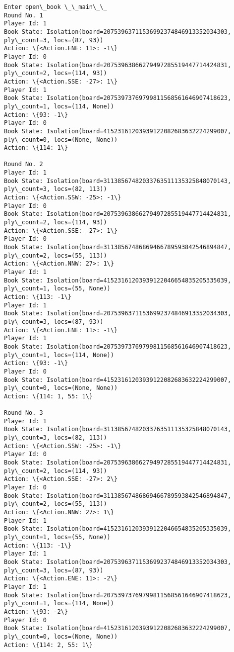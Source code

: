 \documentclass[11pt]{article}
\begin{document}
    \begin{Verbatim}[commandchars=\\\{\}]
Enter open\_book \_\_main\_\_
Round No. 1
Player Id: 1
Book State: Isolation(board=20753963711536992374846913352034303, ply\_count=3, locs=(87, 93))
Action: \{<Action.ENE: 11>: -1\}
Player Id: 0
Book State: Isolation(board=20753963866279497285519447714424831, ply\_count=2, locs=(114, 93))
Action: \{<Action.SSE: -27>: 1\}
Player Id: 1
Book State: Isolation(board=20753973769799811568561646907418623, ply\_count=1, locs=(114, None))
Action: \{93: -1\}
Player Id: 0
Book State: Isolation(board=41523161203939122082683632224299007, ply\_count=0, locs=(None, None))
Action: \{114: 1\}

Round No. 2
Player Id: 1
Book State: Isolation(board=31138567482033763511135325848070143, ply\_count=3, locs=(82, 113))
Action: \{<Action.SSW: -25>: -1\}
Player Id: 0
Book State: Isolation(board=20753963866279497285519447714424831, ply\_count=2, locs=(114, 93))
Action: \{<Action.SSE: -27>: 1\}
Player Id: 0
Book State: Isolation(board=31138567486869466789593842546894847, ply\_count=2, locs=(55, 113))
Action: \{<Action.NNW: 27>: 1\}
Player Id: 1
Book State: Isolation(board=41523161203939122046654835205335039, ply\_count=1, locs=(55, None))
Action: \{113: -1\}
Player Id: 1
Book State: Isolation(board=20753963711536992374846913352034303, ply\_count=3, locs=(87, 93))
Action: \{<Action.ENE: 11>: -1\}
Player Id: 1
Book State: Isolation(board=20753973769799811568561646907418623, ply\_count=1, locs=(114, None))
Action: \{93: -1\}
Player Id: 0
Book State: Isolation(board=41523161203939122082683632224299007, ply\_count=0, locs=(None, None))
Action: \{114: 1, 55: 1\}

Round No. 3
Player Id: 1
Book State: Isolation(board=31138567482033763511135325848070143, ply\_count=3, locs=(82, 113))
Action: \{<Action.SSW: -25>: -1\}
Player Id: 0
Book State: Isolation(board=20753963866279497285519447714424831, ply\_count=2, locs=(114, 93))
Action: \{<Action.SSE: -27>: 2\}
Player Id: 0
Book State: Isolation(board=31138567486869466789593842546894847, ply\_count=2, locs=(55, 113))
Action: \{<Action.NNW: 27>: 1\}
Player Id: 1
Book State: Isolation(board=41523161203939122046654835205335039, ply\_count=1, locs=(55, None))
Action: \{113: -1\}
Player Id: 1
Book State: Isolation(board=20753963711536992374846913352034303, ply\_count=3, locs=(87, 93))
Action: \{<Action.ENE: 11>: -2\}
Player Id: 1
Book State: Isolation(board=20753973769799811568561646907418623, ply\_count=1, locs=(114, None))
Action: \{93: -2\}
Player Id: 0
Book State: Isolation(board=41523161203939122082683632224299007, ply\_count=0, locs=(None, None))
Action: \{114: 2, 55: 1\}


\end{Verbatim}
\end{document}
